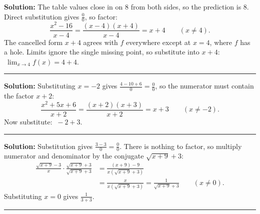 \documentclass[12pt]{article}
\begin{document}



\textbf{Solution:} The table values close in on $8$ from both sides, so the
prediction is $8$. Direct substitution gives $\frac{0}{0}$, so factor:
\[
  \frac{x^2 - 16}{x - 4} = \frac{(x-4)(x+4)}{x-4} = x + 4 \qquad (x \neq 4).
\]
The cancelled form $x+4$ agrees with $f$ everywhere except at $x = 4$, where
$f$ has a hole. Limits ignore the single missing point, so substitute into
$x + 4$: $\ \lim_{x \to 4} f(x) = 4 + 4$. 

\vspace{0.2cm}\noindent\rule{\linewidth}{0.2pt}\vspace{0.2cm}


\textbf{Solution:} Substituting $x = -2$ gives $\frac{4 - 10 + 6}{0} = \frac{0}{0}$,
so the numerator must contain the factor $x + 2$:
\[
  \frac{x^2 + 5x + 6}{x + 2} = \frac{(x+2)(x+3)}{x+2} = x + 3 \qquad (x \neq -2).
\]
Now substitute: $\ -2 + 3$. 

\vspace{0.2cm}\noindent\rule{\linewidth}{0.2pt}\vspace{0.2cm}


\textbf{Solution:} Substitution gives $\frac{3-3}{0} = \frac{0}{0}$. There is
nothing to factor, so multiply numerator and denominator by the conjugate
$\sqrt{x+9} + 3$:
\begin{align*}
  \frac{\sqrt{x+9} - 3}{x} \cdot \frac{\sqrt{x+9} + 3}{\sqrt{x+9} + 3}
    &= \frac{(x + 9) - 9}{x\left(\sqrt{x+9} + 3\right)} \\[2pt]
    &= \frac{x}{x\left(\sqrt{x+9} + 3\right)}
     = \frac{1}{\sqrt{x+9} + 3} \qquad (x \neq 0).
\end{align*}
Substituting $x = 0$ gives $\frac{1}{3 + 3}$. 

\vspace{0.2cm}\noindent\rule{\linewidth}{0.2pt}\vspace{0.2cm}

\end{document}
